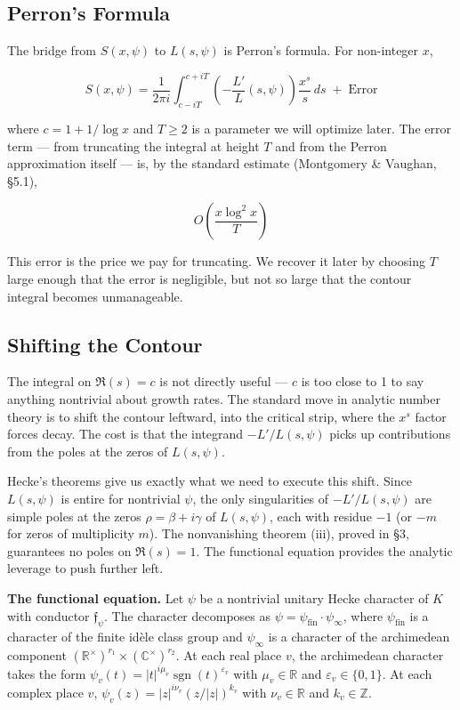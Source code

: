 \documentclass[12pt,a4paper]{article}
\newcommand{\pilcrow}{\S}
\begin{document}
\subsection{Perron's Formula}

The bridge from $S(x, \psi)$ to $L(s, \psi)$ is Perron's formula. For non-integer $x$,

\[
S(x, \psi) = \frac{1}{2\pi i} \int_{c-iT}^{c+iT} \left(-\frac{L'}{L}(s, \psi)\right) \frac{x^s}{s} \, ds \;+\; \text{Error}
\]

where $c = 1 + 1/\log x$ and $T \geq 2$ is a parameter we will optimize later. The error term --- from truncating the integral at height $T$ and from the Perron approximation itself --- is, by the standard estimate (Montgomery \& Vaughan, \pilcrow{}5.1),

\[
O\!\left(\frac{x \log^2 x}{T}\right)
\]

This error is the price we pay for truncating. We recover it later by choosing $T$ large enough that the error is negligible, but not so large that the contour integral becomes unmanageable.

\subsection{Shifting the Contour}

The integral on $\Re(s) = c$ is not directly useful --- $c$ is too close to 1 to say anything nontrivial about growth rates. The standard move in analytic number theory is to shift the contour leftward, into the critical strip, where the $x^s$ factor forces decay. The cost is that the integrand $-L'/L(s, \psi)$ picks up contributions from the poles at the zeros of $L(s, \psi)$.

Hecke's theorems give us exactly what we need to execute this shift. Since $L(s, \psi)$ is entire for nontrivial $\psi$, the only singularities of $-L'/L(s, \psi)$ are simple poles at the zeros $\rho = \beta + i\gamma$ of $L(s, \psi)$, each with residue $-1$ (or $-m$ for zeros of multiplicity $m$). The nonvanishing theorem (iii), proved in \pilcrow{}3, guarantees no poles on $\Re(s) = 1$. The functional equation provides the analytic leverage to push further left.

\textbf{The functional equation.} Let $\psi$ be a nontrivial unitary Hecke character of $K$ with conductor $\mathfrak{f}_{\psi}$. The character decomposes as $\psi = \psi_{\text{fin}} \cdot \psi_{\infty}$, where $\psi_{\text{fin}}$ is a character of the finite idèle class group and $\psi_{\infty}$ is a character of the archimedean component $(\mathbb{R}^\times)^{r_1} \times (\mathbb{C}^\times)^{r_2}$. At each real place $v$, the archimedean character takes the form $\psi_v(t) = |t|^{i\mu_v} \operatorname{sgn}(t)^{\varepsilon_v}$ with $\mu_v \in \mathbb{R}$ and $\varepsilon_v \in \{0,1\}$. At each complex place $v$, $\psi_v(z) = |z|^{i\nu_v} (z/|z|)^{k_v}$ with $\nu_v \in \mathbb{R}$ and $k_v \in \mathbb{Z}$.
\end{document}
